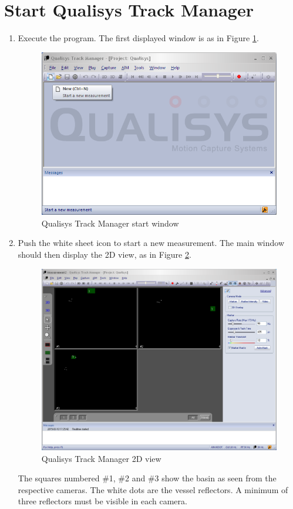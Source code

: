 \documentclass[a4paper,twoside,english]{report}
\begin{document}
\section{Start Qualisys Track Manager}
\begin{enumerate}
\item Execute the program. The first displayed window is as in Figure \ref{fig: Qualisys Track Manager start window}.
\begin{figure}[!h]
\centering \includegraphics[width=1\textwidth]{fig/qualisys_new} \caption{\label{fig: Qualisys Track Manager start window}Qualisys Track Manager
start window}
\end{figure}
\item Push the white sheet icon to start a new measurement. The main window
should then display the 2D view, as in Figure \ref{fig: Qualisys Track Manager 2D view}.
\begin{figure}[!h]
\centering \includegraphics[width=1\textwidth]{fig/qualisys_3cams} \caption{\label{fig: Qualisys Track Manager 2D view}Qualisys Track Manager
2D view}
\end{figure}
 The squares numbered \#1, \#2 and \#3 show the basin as seen from
the respective cameras. The white dots are the vessel reflectors.
A minimum of three reflectors must be visible in each camera. 
\end{enumerate}
\end{document}
